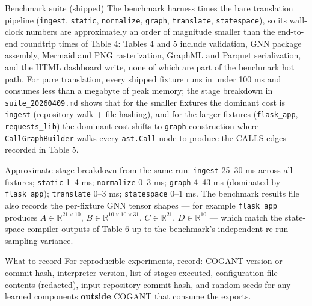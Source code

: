 \documentclass[
  ignorenonframetext,
]{beamer}
\newcounter{none} %
\begin{document}
\begin{frame}[fragile]{Benchmark suite (shipped)}
The benchmark harness times the bare translation pipeline
(\texttt{ingest}, \texttt{static}, \texttt{normalize}, \texttt{graph},
\texttt{translate}, \texttt{statespace}), so its wall-clock numbers are
approximately an order of magnitude smaller than the end-to-end
roundtrip times of Table 4: Tables 4 and 5 include validation, GNN
package assembly, Mermaid and PNG rasterization, GraphML and Parquet
serialization, and the HTML dashboard write, none of which are part of
the benchmark hot path. For pure translation, every shipped fixture runs
in under 100 ms and consumes less than a megabyte of peak memory; the
stage breakdown in \texttt{suite\_20260409.md} shows that for the
smaller fixtures the dominant cost is \texttt{ingest} (repository walk +
file hashing), and for the larger fixtures (\texttt{flask\_app},
\texttt{requests\_lib}) the dominant cost shifts to \texttt{graph}
construction where \texttt{CallGraphBuilder} walks every
\texttt{ast.Call} node to produce the CALLS edges recorded in Table 5.

Approximate stage breakdown from the same run: \texttt{ingest} 25--30 ms
across all fixtures; \texttt{static} 1--4 ms; \texttt{normalize} 0--3
ms; \texttt{graph} 4--43 ms (dominated by \texttt{flask\_app});
\texttt{translate} 0--3 ms; \texttt{statespace} 0--1 ms. The benchmark
results file also records the per-fixture GNN tensor shapes --- for
example \texttt{flask\_app} produces
\(A \in \mathbb{R}^{21 \times 10}\),
\(B \in \mathbb{R}^{10 \times 10 \times 31}\),
\(C \in \mathbb{R}^{21}\), \(D \in \mathbb{R}^{10}\) --- which match the
state-space compiler outputs of Table 6 up to the benchmark's
independent re-run sampling variance.
\end{frame}

\begin{frame}{What to record}
\protect{}\label{what-to-record}
For reproducible experiments, record: COGANT version or commit hash,
interpreter version, list of stages executed, configuration file
contents (redacted), input repository commit hash, and random seeds for
any learned components \textbf{outside} COGANT that consume the exports.
\end{frame}
\end{document}
